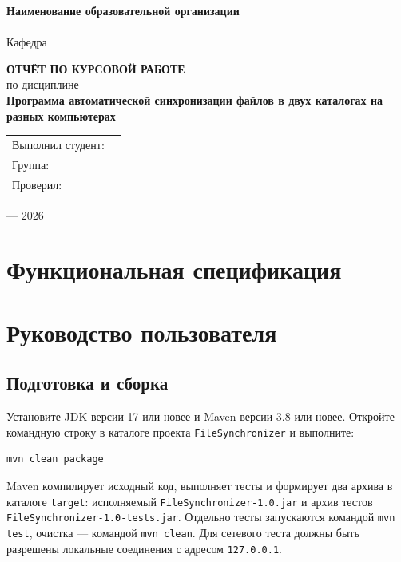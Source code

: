 \documentclass[12pt,a4paper]{article}
\begin{document}
\begin{titlepage}
\begin{center}
\textbf{Наименование образовательной организации}\\[1mm]
\underline{\hspace{125mm}}\\[3mm]
Кафедра \underline{\hspace{95mm}}

\vfill
{\Large\bfseries ОТЧЁТ ПО КУРСОВОЙ РАБОТЕ}\\[6mm]
{\large по дисциплине \underline{\hspace{70mm}}}\\[7mm]
{\large\bfseries Программа автоматической синхронизации файлов в двух каталогах на разных компьютерах}
\end{center}
\vfill
\begin{flushright}
\begin{tabular}{ll}
Выполнил студент: & \underline{\hspace{55mm}}\\[4mm]
Группа: & \underline{\hspace{55mm}}\\[4mm]
Проверил: & \underline{\hspace{55mm}}
\end{tabular}
\end{flushright}
\vfill
\begin{center}
\underline{\hspace{50mm}} --- 2026
\end{center}
\end{titlepage}

\tableofcontents
\newpage
\section{Функциональная спецификация}


\section{Руководство пользователя}
\subsection{Подготовка и сборка}

Установите JDK версии 17 или новее и Maven версии 3.8 или новее. Откройте командную строку в каталоге проекта \texttt{FileSynchronizer} и выполните:
\begin{verbatim}
mvn clean package
\end{verbatim}
Maven компилирует исходный код, выполняет тесты и формирует два архива в каталоге \texttt{target}: исполняемый \texttt{FileSynchronizer-1.0.jar} и архив тестов \texttt{FileSynchronizer-1.0-tests.jar}. Отдельно тесты запускаются командой \texttt{mvn test}, очистка --- командой \texttt{mvn clean}. Для сетевого теста должны быть разрешены локальные соединения с адресом \texttt{127.0.0.1}.
\end{document}
